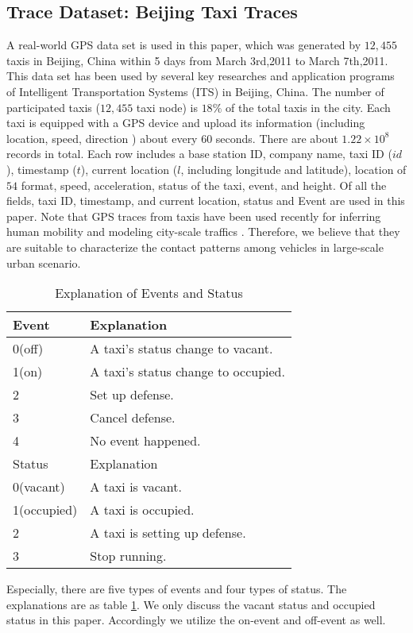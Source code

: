 \subsection{Trace Dataset: Beijing Taxi Traces}
\label{section_trace_data}

A real-world GPS data set is used in this paper, which was generated by $12,455$ taxis in Beijing, China within 5 days from March 3rd,2011 to March 7th,2011. This data set has been used by several key researches and application programs of Intelligent Transportation Systems (ITS) in Beijing, China. The number of participated taxis ($12,455$ taxi node) is $18\%$ of the total taxis in the city. Each taxi is equipped with a GPS device and upload its information (including location, speed, direction ) about every 60 seconds. There are about $1.22 \times 10^8$ records in total.
Each row includes a base station ID, company name, taxi ID ($id$), timestamp ($t$), current location ($l$, including longitude and latitude), location of $54$ format, speed, acceleration, status of the taxi, event, and height. Of all the fields, taxi ID, timestamp, and current location, status and Event are used in this paper.  Note that GPS traces from taxis have been used recently for inferring human mobility \cite{Ganti} and modeling city-scale traffics \cite{Aslam}. Therefore, we believe that they are suitable to characterize the contact patterns among vehicles in large-scale urban scenario.

\begin{table}[!t]
\caption{Explanation of Events and Status}\label{table_event_detail}
\centering
\begin{tabular}{l|l}
  \hline
  Event & Explanation \\
  \hline
  0(off) & A taxi's status change to vacant.\\
  \hline
  1(on) & A taxi's status change to occupied.\\
  \hline
  2 & Set up defense.\\
  \hline
  3 & Cancel defense.\\
  \hline
  4 & No event happened.\\
  \hline
  \hline
  Status & Explanation \\
  \hline
0(vacant) & A taxi is vacant. \\
    \hline
1(occupied) & A taxi is occupied. \\
    \hline
2 & A taxi is setting up defense. \\
    \hline
3 & Stop running.\\
  \hline
\end{tabular}
\end{table}


Especially, there are five types of events and four types of status. The explanations are as table \ref{table_event_detail}. We only discuss the vacant status and occupied status in this paper. Accordingly we utilize the on-event and off-event as well.






